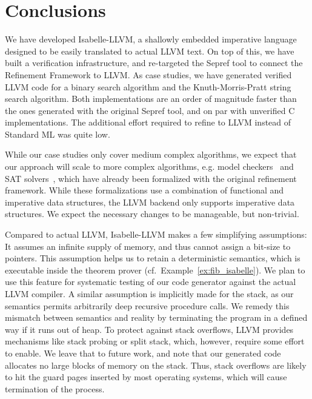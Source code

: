 \documentclass[a4paper,USenglish,cleveref, autoref]{lipics-v2019}
\begin{document}




\section{Conclusions}
We have developed Isabelle-LLVM, a shallowly embedded imperative language designed to be easily translated to actual LLVM text. 
On top of this, we have built a verification 
infrastructure, and re-targeted the Sepref tool to connect the Refinement Framework to LLVM. 
As case studies, we have generated verified LLVM code for a binary search algorithm and the Knuth-Morris-Pratt string search algorithm.
Both implementations are an order of magnitude faster than the ones generated with the original Sepref tool, and on par with unverified C implementations.
The additional effort required to refine to LLVM instead of Standard ML was quite low.

While our case studies only cover medium complex algorithms, we expect that our approach will scale to more complex algorithms, e.g.
model checkers~\cite{WiLa18,FBL18} and SAT solvers~\cite{FBL18}, which have already been formalized with the original refinement framework. 
While these formalizations use a combination of functional and imperative data structures, the LLVM backend only supports imperative data structures. 
We expect the necessary changes to be manageable, but non-trivial.

Compared to actual LLVM, Isabelle-LLVM makes a few simplifying assumptions: It assumes an infinite supply of memory, and thus cannot assign a bit-size to pointers. 
This assumption helps us to retain a deterministic semantics, which is executable inside the theorem prover (cf.~Example~\ref{ex:fib_isabelle}). 
We plan to use this feature for systematic testing of our code generator against the actual LLVM compiler. 
A similar assumption is implicitly made for the stack, as our semantics permits arbitrarily deep recursive procedure calls.
We remedy this mismatch between semantics and reality by terminating the program in a defined way if it runs out of heap.
To protect against stack overflows, LLVM provides mechanisms like stack probing or split stack, which, however, require some effort to enable. 
We leave that to future work, and note that our generated code allocates no large blocks of memory on the stack. 
Thus, stack overflows are likely to hit the guard pages inserted by most operating systems, which will cause termination of the process.
\end{document}
